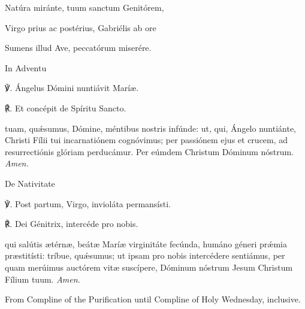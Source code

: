 {
Natúra miránte, tuum sanctum Genitórem,\par
Virgo prius ac postérius, Gabriélis ab ore\par
Sumens illud Ave, peccatórum miserére.\par
\begin{inhead}
	In Adventu
\end{inhead}
℣. Ángelus Dómini nuntiávit Marí{\ae}.\par
℟. Et concépit de Spíritu Sancto.\par
\oremuslatin
{} tuam, quǽsumus, Dómine, méntibus nostris infúnde: ut, qui, Ángelo nuntiánte, Christi Fílii tui incarnatiónem cognóvimus; per passiónem ejus et crucem, ad resurrectiónis glóriam perducámur. Per eúmdem Christum Dóminum nóstrum. \textit{Amen.}\par
\begin{inhead}
	De Nativitate
\end{inhead}
℣. Post partum, Virgo, invioláta permansísti.\par
℟. Dei Génitrix, intercéde pro nobis.\par
\oremuslatin
{} qui salútis {\ae}térn{\ae}, beát{\ae} Marí{\ae} virginitáte fecúnda, humáno géneri prǽmia pr{\ae}stitísti: tríbue, quǽsumus; ut ipsam pro nobis intercédere sentiámus, per quam merúimus auctórem vit{\ae} suscípere, Dóminum nóstrum Jesum Christum Fílium tuum. \textit{Amen.}}
\vspace{-2ex}
\vspace{-1ex}
\begin{inhead}
From Compline of the Purification until Compline of Holy Wednesday, inclusive.
\end{inhead}
